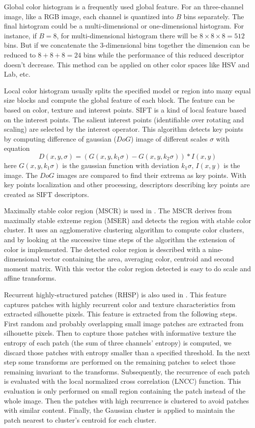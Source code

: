 Global color histogram is a frequently used global feature. For an three-channel image, like a RGB image, each channel is quantized into $B$ bins separately. The final histogram could be a multi-dimensional or one-dimensional histogram. For instance, if $B = 8$, for multi-dimensional histogram there will be  $8\times 8\times 8 = 512$ bins. But if we concatenate the 3-dimensional bins together the dimension can be reduced to $8 + 8 + 8 = 24$ bins while the performance of this reduced descriptor doesn't decrease. This method can be applied on other color spaces like HSV and Lab, etc.

Local color histogram usually splits the specified model or region into many equal size blocks and compute the global feature of each block. The feature can be based on color, texture and interest points. SIFT \cite{SIFT} is a kind of local feature based on the interest points. The salient interest points (identifiable over rotating and scaling) are selected by the interest operator. This algorithm detects key points by computing difference of gaussian ($DoG$) image of different scales $\sigma$ with equation
\begin{equation}
D(x,y,\sigma) = (G(x,y,k_1\sigma) - G(x,y,k_2\sigma))\ast I(x,y)
\end{equation}
here $G(x,y,k_1\sigma)$ is the gaussian function with deviation $k_1\sigma$, $I(x,y)$ is the image. The $DoG$ images are compared to find their extrema as key points. With key points localization and other processing, descriptors describing key points are created as SIFT descriptors.

Maximally stable color region (MSCR) is used in \cite{SDALF}. The MSCR derives from maximally stable extreme region (MSER) and detects the region with stable color cluster. It uses an agglomerative clustering algorithm to compute color clusters, and by looking at the successive time steps of the algorithm the extension of color is implemented. The detected color region is described with a nine-dimensional vector containing the area, averaging color, centroid and second moment matrix. With this vector the color region detected is easy to do scale and affine transforms.

Recurrent highly-structured patches (RHSP) is also used in \cite{SDALF}. This feature captures patches with highly recurrent color and texture characteristics from extracted silhouette pixels. This feature is extracted from the following steps. First random and probably overlapping small image patches are extracted from silhouette pixels. Then to capture those patches with informative texture the entropy of each patch (the sum of three channels' entropy) is computed, we discard those patches with entropy smaller than a specified threshold. In the next step some transforms are performed on the remaining patches to select those remaining invariant to the transforms. Subsequently, the recurrence of each patch is evaluated with the local normalized cross correlation (LNCC) function. This evaluation is only performed on small region containing the patch instead of the whole image. Then the patches with high recurrence is clustered to avoid patches with similar content. Finally, the Gaussian cluster is applied to maintain the patch nearest to cluster's centroid for each cluster.

